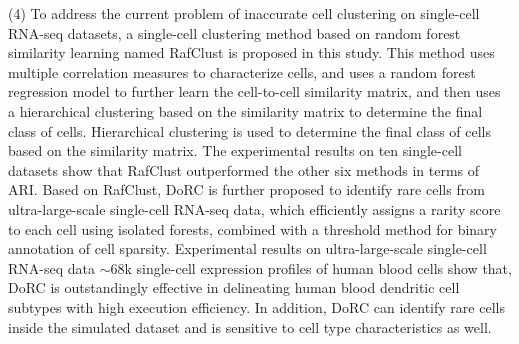 \begin{abstracten}
(4) To address the current problem of inaccurate cell clustering on single-cell RNA-seq datasets, 
a single-cell clustering method based on random forest similarity learning named RafClust is proposed in this study.  
This method uses multiple correlation measures to characterize cells, and uses a random forest regression model to further learn the cell-to-cell similarity matrix, and then uses a hierarchical clustering based on the similarity matrix to determine the final class of cells. 
Hierarchical clustering is used to determine the final class of cells based on the similarity matrix. 
The experimental results on ten single-cell datasets show that RafClust outperformed the other six methods in terms of ARI. 
Based on RafClust, DoRC is further proposed to identify rare cells from ultra-large-scale single-cell RNA-seq data, 
which efficiently assigns a rarity score to each cell using isolated forests, combined with a threshold method for binary annotation of cell sparsity. 
Experimental results on ultra-large-scale single-cell RNA-seq data ${\sim}68$k single-cell expression profiles of human blood cells show that,
DoRC is outstandingly effective in delineating human blood dendritic cell subtypes with high execution efficiency. 
In addition, DoRC can identify rare cells inside the simulated dataset and is sensitive to cell type characteristics as well.


\end{abstracten}